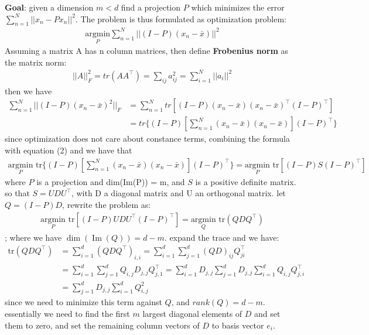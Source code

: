 \documentclass[11pt]{article}
\theoremstyle{plain}
\theoremstyle{definition}
\DeclareMathOperator{\Ima}{Im}
\begin{document}
\textbf{Goal}: given a dimension $m < d$ find a projection $P$ which minimizes the error $\sum\limits_{n=1}^{N} ||x_n - Px_n ||^2$.
The problem is thus formulated as optimization problem: \begin{align*}
\underset{P} {\text{argmin}} \sum\limits_{n=1}^N || (I-P)(x_n-\bar{x})||^2
\end{align*}
Assuming a matrix A has n column matrices, then define \textbf{Frobenius norm} as the matrix norm: \begin{align*}
||A||_F^2 = tr(AA^\top) = \sum\limits_{ij}a_{ij}^2 = \sum\limits_{i=1}^N ||a_i||^2
\end{align*}
then we have \begin{align*}
\sum\limits_{n=1}^N ||(I-P)(x_n-\bar{x})^2||_F &= \sum\limits_{n=1}^N tr[(I-P)(x_n-\bar{x})(x_n-\bar{x})^\top (I-P)^\top] \\
&= tr\{(I-P)[\sum\limits_{n=1}^N (x_n - \bar{x})(x_n -\bar{x})](I-P)^\top\}
\end{align*}
since optimization does not care about constance terms, combining the formula with equation (2) and we have that \begin{align*}
\underset{P}{\text{argmin}} \text{  tr}\{(I-P)[\sum\limits_{n=1}^N (x_n - \bar{x})(x_n -\bar{x})](I-P)^\top\} =\underset{P}{\text{argmin}} \text{  tr}[(I-P)S(I-P)^\top]
\end{align*}
where $P$ is a projection and dim(Im(P)) = m, and $S$ is a positive definite matrix. so that $S = UDU^\top$, with D a diagonal matrix and U an orthogonal matrix. let $Q = (I-P)D$, rewrite the problem as: \begin{align*}
\underset{P}{\text{argmin}} \text{  tr} [(I-P)UDU^\top(I-P)^\top] = \underset{Q}{\text{argmin}} \text{  tr} (QDQ^\top) 
\end{align*}; 
where we have $\dim(\Ima(Q)) = d-m$. expand the trace and we have: \begin{align*}
\text{tr}(QDQ^\top) &= \sum\limits_{i=1}^{d} (QDQ^\top)_{i,i} =\sum\limits_{i=1}^{d} \sum\limits_{j=1}^{d} (QD)_{ij} Q^\top_{ji} \\
&= \sum\limits_{i=1}^{d} \sum\limits_{j=1}^{d} Q_{i,j}D_{j,j}Q^\top_{j,1} = \sum\limits_{i=1}^{d} D_{j,j} \sum\limits_{j=1}^{d} D_{j,j} \sum\limits_{i=1}^{d} Q_{i,j}Q^\top_{j,i} \\
&= \sum\limits_{j=1}^{d} D_{j,j} \sum\limits_{i=1}^{d} Q_{i,j}^2
\end{align*}
since we need to minimize this term against $Q$, and $rank(Q) = d-m$. essentially we need to find the first $m$ largest diagonal elements of $D$ and set them to zero, and set the remaining column vectors of $D$ to basis vector $e_i$.
\end{document}
